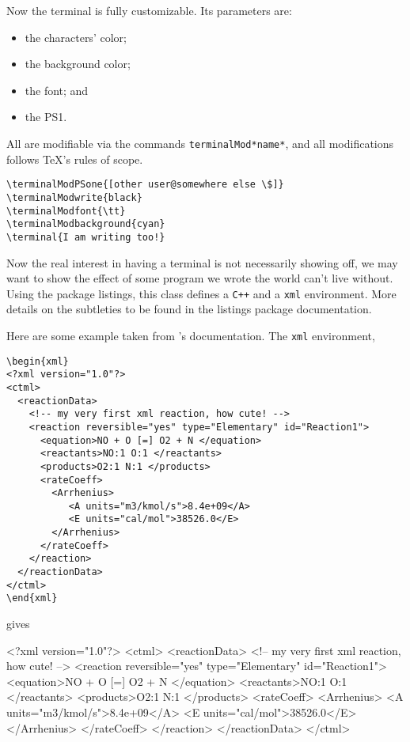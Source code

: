 \documentclass{documentation}
\begin{document}
Now the terminal is fully customizable. Its parameters are:
\begin{itemize}
\item the characters' color;
\item the background color;
\item the font; and
\item the PS1.
\end{itemize}
All are modifiable via the commands \verb!terminalMod*name*!,
and all modifications follows \TeX's rules of scope.
{
\begin{verbatim}
\terminalModPSone{[other user@somewhere else \$]}
\terminalModwrite{black}
\terminalModfont{\tt}
\terminalModbackground{cyan}
\terminal{I am writing too!}
\end{verbatim}
\terminalModfont{\tt}
}

Now the real interest in having a terminal is not
necessarily showing off, we may want to show the effect
of some program we wrote the world can't live without.
Using the package \textsf{listings}, this class defines
a \texttt{C++} and a \texttt{xml} environment. More
details on the subtleties to be found in the
\textsf{listings} package documentation.

Here are some example taken from \Antioch's documentation.
The \texttt{xml} environment,
\begin{verbatim}
\begin{xml}
<?xml version="1.0"?>
<ctml>
  <reactionData>
    <!-- my very first xml reaction, how cute! -->
    <reaction reversible="yes" type="Elementary" id="Reaction1">
      <equation>NO + O [=] O2 + N </equation>
      <reactants>NO:1 O:1 </reactants>
      <products>O2:1 N:1 </products>
      <rateCoeff>
        <Arrhenius>
           <A units="m3/kmol/s">8.4e+09</A>
           <E units="cal/mol">38526.0</E>
        </Arrhenius>
      </rateCoeff>
    </reaction>
  </reactionData>
</ctml>
\end{xml}
\end{verbatim}
gives
\begin{xml}
<?xml version="1.0"?>
<ctml>
  <reactionData>
    <!-- my very first xml reaction, how cute! -->
    <reaction reversible="yes" type="Elementary" id="Reaction1">
      <equation>NO + O [=] O2 + N </equation>
      <reactants>NO:1 O:1 </reactants>
      <products>O2:1 N:1 </products>
      <rateCoeff>
        <Arrhenius>
           <A units="m3/kmol/s">8.4e+09</A>
           <E units="cal/mol">38526.0</E>
        </Arrhenius>
      </rateCoeff>
    </reaction>
  </reactionData>
</ctml>
\end{xml}
\end{document}
